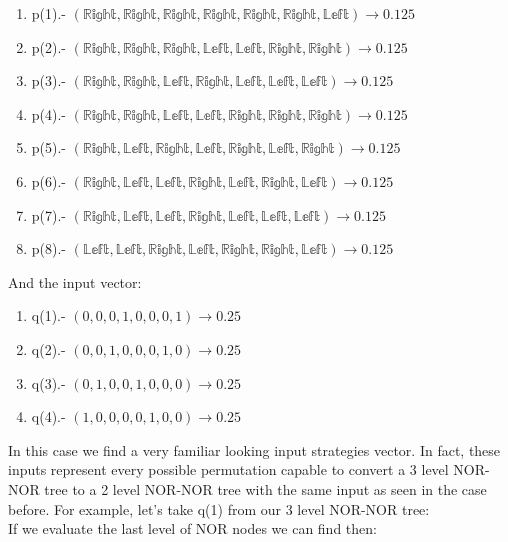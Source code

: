 \documentclass[a4paper,10pt]{article}
\begin{document}
\begin{enumerate}
  \item p(1).- $(\mathbb{Right},\mathbb{Right},\mathbb{Right},\mathbb{Right},\mathbb{Right},\mathbb{Right},\mathbb{Left}) \to 0.125$
  \item p(2).- $(\mathbb{Right},\mathbb{Right},\mathbb{Right},\mathbb{Left},\mathbb{Left},\mathbb{Right},\mathbb{Right}) \to 0.125$
  \item p(3).- $(\mathbb{Right},\mathbb{Right},\mathbb{Left},\mathbb{Right},\mathbb{Left},\mathbb{Left},\mathbb{Left}) \to 0.125$
  \item p(4).- $(\mathbb{Right},\mathbb{Right},\mathbb{Left},\mathbb{Left},\mathbb{Right},\mathbb{Right},\mathbb{Right}) \to 0.125$
  \item p(5).- $(\mathbb{Right},\mathbb{Left},\mathbb{Right},\mathbb{Left},\mathbb{Right},\mathbb{Left},\mathbb{Right}) \to 0.125$
  \item p(6).- $(\mathbb{Right},\mathbb{Left},\mathbb{Left},\mathbb{Right},\mathbb{Left},\mathbb{Right},\mathbb{Left}) \to 0.125$
  \item p(7).- $(\mathbb{Right},\mathbb{Left},\mathbb{Left},\mathbb{Right},\mathbb{Left},\mathbb{Left},\mathbb{Left}) \to 0.125$
  \item p(8).- $(\mathbb{Left},\mathbb{Left},\mathbb{Right},\mathbb{Left},\mathbb{Right},\mathbb{Right},\mathbb{Left}) \to 0.125$
\end{enumerate}

And the input vector:

\begin{enumerate}
  \item q(1).- $(0,0,0,1,0,0,0,1) \to 0.25$
  \item q(2).- $(0,0,1,0,0,0,1,0) \to 0.25$
  \item q(3).- $(0,1,0,0,1,0,0,0) \to 0.25$
  \item q(4).- $(1,0,0,0,0,1,0,0) \to 0.25$
\end{enumerate}

In this case we find a very familiar looking input strategies vector. In fact, these inputs
represent every possible permutation capable to convert a 3 level NOR-NOR tree to a 2 level
NOR-NOR tree with the same input as seen in the case before. For example, let's take
q(1) from our 3 level NOR-NOR tree: \\


If we evaluate the last level of NOR nodes we can find then: \\
\end{document}
